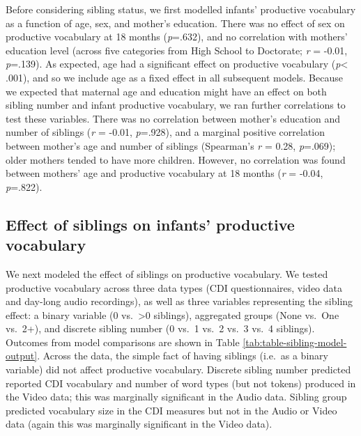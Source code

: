\documentclass[
  english,
  man,floatsintext]{apa6}
\begin{document}
Before considering sibling status, we first modelled infants' productive vocabulary as a function of age, sex, and mother's education. There was no effect of sex on productive vocabulary at 18 months (\emph{p}=.632), and no correlation with mothers' education level (across five categories from High School to Doctorate; \emph{r} = -0.01, \emph{p}=.139). As expected, age had a significant effect on productive vocabulary (\emph{p}\textless{} .001), and so we include age as a fixed effect in all subsequent models. Because we expected that maternal age and education might have an effect on both sibling number and infant productive vocabulary, we ran further correlations to test these variables. There was no correlation between mother's education and number of siblings (\emph{r} = -0.01, \emph{p}=.928), and a marginal positive correlation between mother's age and number of siblings (Spearman's \emph{r} = 0.28, \emph{p}=.069); older mothers tended to have more children. However, no correlation was found between mothers' age and productive vocabulary at 18 months (\emph{r} = -0.04, \emph{p}=.822).

\hypertarget{effect-of-siblings-on-infants-productive-vocabulary}{%
\subsection{Effect of siblings on infants' productive vocabulary}\label{effect-of-siblings-on-infants-productive-vocabulary}}

We next modeled the effect of siblings on productive vocabulary. We tested productive vocabulary across three data types (CDI questionnaires, video data and day-long audio recordings), as well as three variables representing the sibling effect: a binary variable (0 vs.~\textgreater0 siblings), aggregated groups (None vs.~One vs.~2+), and discrete sibling number (0 vs.~1 vs.~2 vs.~3 vs.~4 siblings). Outcomes from model comparisons are shown in Table \ref{tab:table-sibling-model-output}. Across the data, the simple fact of having siblings (i.e.~as a binary variable) did not affect productive vocabulary. Discrete sibling number predicted reported CDI vocabulary and number of word types (but not tokens) produced in the Video data; this was marginally significant in the Audio data. Sibling group predicted vocabulary size in the CDI measures but not in the Audio or Video data (again this was marginally significant in the Video data).
\end{document}
